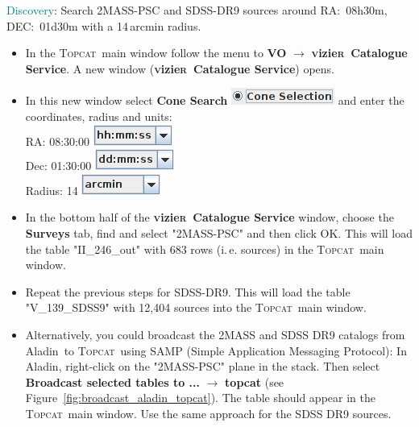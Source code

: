 \documentclass [a4paper, 12pt]{article}
\newcommand{\aladin}{{\textsc{A}{ladin}}}
\newcommand{\topcat}{{\textsc{Topcat}}}
\newcommand{\vizier}{{\textsc{v}izie\textsc{r}}}
\begin{document}
\noindent \textcolor{teal}{Discovery}: Search 2MASS-PSC and SDSS-DR9 sources 
around RA:~08h30m, DEC:~01d30m with a 14\,arcmin radius.
\begin{itemize}
    \item In the \topcat\ main window follow the menu to \textbf{VO} 
    $\rightarrow$ \textbf{\vizier\ Catalogue Service}. A new window 
    (\textbf{\vizier\ Catalogue Service}) opens. 
    \item In this new window select \textbf{Cone Search} 
    \includegraphics[width=0.2 
    \textwidth]{../images/topcat_vizier_cone-search.png} and enter the 
    coordinates, radius and units:\\
    RA: 08:30:00 \includegraphics[width=0.1 
    \textwidth]{../images/topcat_vizier_hms.png}\\
    Dec: 01:30:00 \includegraphics[width=0.1 
    \textwidth]{../images/topcat_vizier_dms.png}\\
    Radius: 14 \includegraphics[width=0.1 
    \textwidth]{../images/topcat_vizier_arcmin.png}
    \item In the bottom half of the \textbf{\vizier\ Catalogue Service} window, 
    choose the \textbf{Surveys} tab, find and select "2MASS-PSC" and then click 
    OK. This will load the table "II\_246\_out" with 683 rows (i.\,e. sources) 
    in 
    the \topcat\ main window. 
    \item Repeat the previous steps for SDSS-DR9. This will load the table 
    "V\_139\_SDSS9" with 12,404 sources into the \topcat\ main window. 
    \item Alternatively, you could broadcast the 2MASS and SDSS DR9 catalogs 
    from \aladin\ to \topcat\ using SAMP (Simple Application Messaging 
    Protocol): In \aladin, right-click on the "2MASS-PSC" plane in the stack. 
    Then select \textbf{Broadcast selected tables to ...} $\rightarrow$ 
    \textbf{topcat} (see Figure~\ref{fig:broadcast_aladin_topcat}). The table 
    should appear in the \topcat\ main window. Use 
    the same approach for the SDSS DR9 sources.
    \begin{figure}[H]

\end{figure}
\end{itemize}
\end{document}
